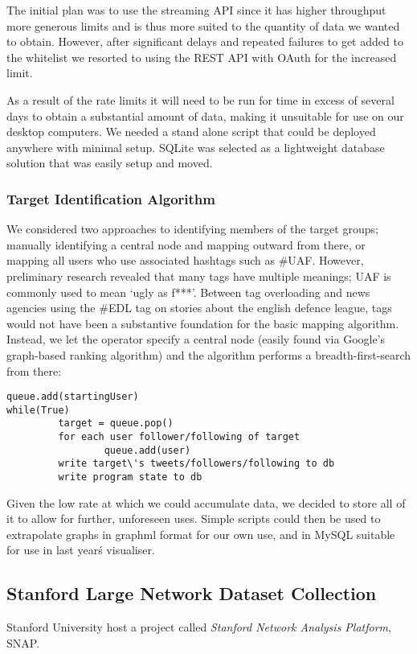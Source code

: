 The initial plan was to use the streaming API since it has higher throughput more generous limits and is thus more suited to the quantity of data we wanted to obtain. However, after significant delays and repeated failures to get added to the whitelist we resorted to using the REST API with OAuth for the increased limit.

As a result of the rate limits it will need to be run for time in excess of several days to obtain a substantial amount of data, making it unsuitable for use on our desktop computers. We needed a stand alone script that could be deployed anywhere with minimal setup. SQLite was selected as a lightweight database solution that was easily setup and moved.

\subsubsection{Target Identification Algorithm}
We considered two approaches to identifying members of the target groups; manually identifying a central node and mapping outward from there, or mapping all users who use associated hashtags such as \#UAF. However, preliminary research revealed that many tags have multiple meanings; UAF is commonly used to mean `ugly as f***'. Between tag overloading and news agencies using the \#EDL tag on stories about the english defence league, tags would not have been a substantive foundation for the basic mapping algorithm. Instead, we let the operator specify a central node (easily found via Google's graph-based ranking algorithm) and the algorithm performs a breadth-first-search from there:

\begin{verbatim}
queue.add(startingUser)
while(True)
         target = queue.pop()
         for each user follower/following of target
                 queue.add(user)
         write target\'s tweets/followers/following to db
         write program state to db
\end{verbatim}

Given the low rate at which we could accumulate data, we decided to store all of it to allow for further, unforeseen uses. Simple scripts could then be used to extrapolate graphs in graphml format for our own use, and in MySQL suitable for use in last year\'s visualiser.

\subsection{Stanford Large Network Dataset Collection}
\label{sec:des_snap}
Stanford University host a project called \emph{Stanford Network Analysis Platform}, SNAP.


